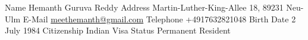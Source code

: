\begin{cvskills}
  \cvskill
    {Name} %
    {Hemanth Guruva Reddy} %
  \cvskill
    {Address} %
    {Martin-Luther-King-Allee 18, 89231 Neu-Ulm} %
  \cvskill
    {E-Mail} %
    {%
		\href{mailto:meethemanth@gmail.com}{\faEnvelope\acvHeaderIconSep meethemanth@gmail.com}%
    } %
  \cvskill
    {Telephone} %
    {%
		\faMobile\acvHeaderIconSep +4917632821048
    } %
  \cvskill
    {Birth Date} %
    {2 July 1984} %
  \cvskill
    {Citizenship} %
    {Indian} %
  \cvskill
    {Visa Status} %
    {Permanent Resident} %
\end{cvskills}
